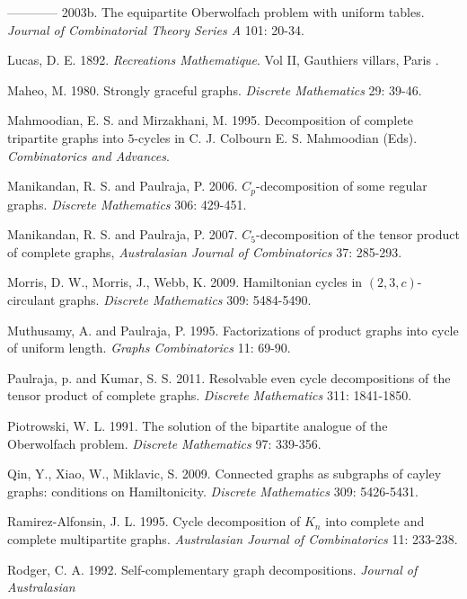 \documentclass[12pt]{report}
\begin{document}
\begin{newpage}
\begin{description}
\item ------------ 2003b. The equipartite Oberwolfach problem with uniform
tables. {\it Journal of Combinatorial Theory Series A } 101: 20-34.
\item Lucas, D. E. 1892. {\it Recreations Mathematique}. Vol II, Gauthiers
villars, Paris .
\item Maheo, M. 1980. Strongly graceful graphs. {\it Discrete Mathematics} 29: 39-46.
\item Mahmoodian, E. S. and Mirzakhani, M. 1995. Decomposition of complete tripartite graphs into
 $5$-cycles in C. J. Colbourn E. S. Mahmoodian (Eds). {\it
 Combinatorics and Advances}.
\item Manikandan, R. S. and Paulraja, P. 2006. $C_p$-decomposition of some
regular
graphs. {\it Discrete Mathematics} 306: 429-451.%
\item Manikandan, R. S. and Paulraja, P. 2007. $C_5$-decomposition of the
tensor product of complete graphs, {\it Australasian Journal of Combinatorics} 37: 285-293.
\item Morris, D. W., Morris, J., Webb, K. 2009. Hamiltonian cycles in
$(2,3,c)$-circulant graphs. {\it Discrete Mathematics} 309: 5484-5490.
\item Muthusamy, A. and Paulraja, P. 1995. Factorizations of product
graphs into cycle of uniform length. {\it Graphs Combinatorics} 11:
69-90.
\item Paulraja, p. and Kumar, S. S. 2011. Resolvable even cycle
decompositions of the tensor product of complete graphs. {\it
Discrete Mathematics} 311: 1841-1850.
\item Piotrowski, W. L. 1991. The solution of the bipartite analogue of
the Oberwolfach problem. {\it Discrete Mathematics} 97: 339-356.
\item Qin, Y., Xiao, W., Miklavic, S. 2009. Connected graphs as subgraphs
of cayley graphs: conditions on Hamiltonicity. {\it Discrete
Mathematics} 309: 5426-5431.
\item Ramirez-Alfonsin, J. L. 1995. Cycle decomposition of $K_n$ into
complete and complete multipartite  graphs. {\it Australasian
Journal of Combinatorics }11: 233-238.
 \item Rodger, C. A. 1992. Self-complementary graph decompositions. {\it Journal of Australasian
}
\end{description}
\end{newpage}
\end{document}
